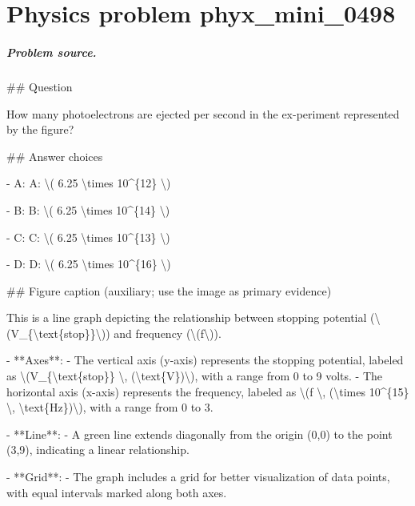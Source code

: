 
\chapter{Physics problem phyx\_mini\_0498}
\label{ch:PhyXMiniProblems_problem_phyx_mini_0498}

\paragraph{Problem source.}
\#\# Question

How many photoelectrons are ejected per second in the ex-periment represented by the figure?

\#\# Answer choices

- A: A: \textbackslash{}( 6.25 \textbackslash{}times 10\textasciicircum{}\{12\} \textbackslash{})

- B: B: \textbackslash{}( 6.25 \textbackslash{}times 10\textasciicircum{}\{14\} \textbackslash{})

- C: C: \textbackslash{}( 6.25 \textbackslash{}times 10\textasciicircum{}\{13\} \textbackslash{})

- D: D: \textbackslash{}( 6.25 \textbackslash{}times 10\textasciicircum{}\{16\} \textbackslash{})

\#\# Figure caption (auxiliary; use the image as primary evidence)

This is a line graph depicting the relationship between stopping potential (\textbackslash{}(V\_\{\textbackslash{}text\{stop\}\}\textbackslash{})) and frequency (\textbackslash{}(f\textbackslash{})).

- **Axes**:
  - The vertical axis (y-axis) represents the stopping potential, labeled as \textbackslash{}(V\_\{\textbackslash{}text\{stop\}\} \textbackslash{}, (\textbackslash{}text\{V\})\textbackslash{}), with a range from 0 to 9 volts.
  - The horizontal axis (x-axis) represents the frequency, labeled as \textbackslash{}(f \textbackslash{}, (\textbackslash{}times 10\textasciicircum{}\{15\} \textbackslash{}, \textbackslash{}text\{Hz\})\textbackslash{}), with a range from 0 to 3.

- **Line**:
  - A green line extends diagonally from the origin (0,0) to the point (3,9), indicating a linear relationship.

- **Grid**:
  - The graph includes a grid for better visualization of data points, with equal intervals marked along both axes.

